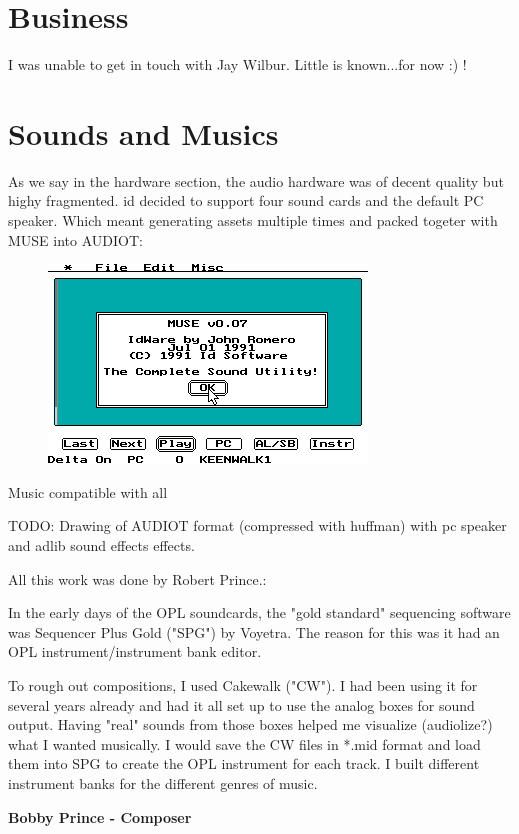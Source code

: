 \documentclass[book.tex]{subfiles}
\begin{document}
\section{Business}
I was unable to get in touch with Jay Wilbur. Little is known...for now :) !\\




\section{Sounds and Musics}
As we say in the hardware section, the audio hardware was of decent quality but highy fragmented. id decided to support four sound cards and the default PC speaker. Which meant generating assets multiple times and packed togeter with MUSE into AUDIOT:\\
\begin{figure}[H]
\centering
 \includegraphics[width=\textwidth]{imgs/muse.png}
 \end{figure}
 \par
Music compatible with all 

TODO: Drawing of AUDIOT format (compressed with huffman) with pc speaker and adlib sound effects effects.

All this work was done by Robert Prince.:\\
\par
 \begin{fancyquotes}
In the early days of the OPL soundcards, the "gold standard" sequencing software was Sequencer Plus Gold ("SPG") by Voyetra. The reason for this was it had an OPL instrument/instrument bank editor.\\
\par
To rough out compositions, I used Cakewalk ("CW"). I had been using it for several years already and had it all set up to use the analog boxes for sound output. Having "real" sounds from those boxes helped me visualize (audiolize?) what I wanted musically. I would save the CW files in *.mid format and load them into SPG to create the OPL instrument for each track. I built different instrument banks for the different genres of music.

\textbf{Bobby Prince - Composer}
 \end{fancyquotes}\\
\end{document}
